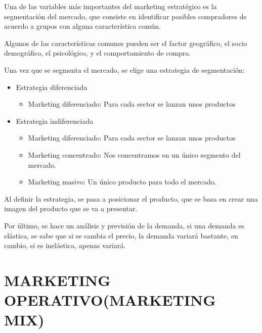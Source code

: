 \documentclass[12pt, twoside, openright]{report} %
\begin{document}
Una de las variables más importantes del marketing estratégico es la segmentación del mercado,
que consiste en identificar posibles compradores de acuerdo a grupos con alguna característica
común.

Algunos de las características comunes pueden ser el factor geográfico, el socio demográfico, el
psicológico, y el comportamiento de compra.

Una vez que se segmenta el mercado, se elige una estrategia de segmentación:
\begin{itemize}
	\item Estrategia diferenciada
	      \begin{itemize}
		      \item Marketing diferenciado: Para cada sector se lanzan unos productos
	      \end{itemize}
	\item Estrategia indiferenciada
	      \begin{itemize}
		      \item Marketing diferenciado: Para cada sector se lanzan unos productos
		      \item Marketing concentrado: Nos concentramos en un único segmento del mercado.
		      \item Marketing masivo: Un único producto para todo el mercado.
	      \end{itemize}
\end{itemize}

Al definir la estrategia, se pasa a posicionar el producto, que se basa en crear una imagen del
producto que se va a presentar.

Por último, se hace un análisis y previsión de la demanda, si una demanda es elástica, se sabe que si
se cambia el precio, la demanda variará bastante, en cambio, si es inelástica, apenas variará.

\section{MARKETING OPERATIVO(MARKETING MIX)}
\end{document}
